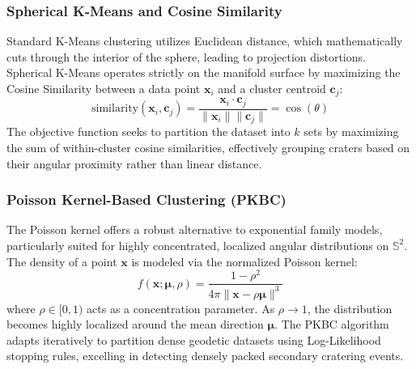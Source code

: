 \documentclass[12pt,a4paper]{report}
\begin{document}
\subsubsection{Spherical K-Means and Cosine Similarity}
Standard K-Means clustering utilizes Euclidean distance, which mathematically cuts through the interior of the sphere, leading to projection distortions. Spherical K-Means operates strictly on the manifold surface by maximizing the Cosine Similarity between a data point $\mathbf{x}_i$ and a cluster centroid $\mathbf{c}_j$:
\begin{equation}
    \text{similarity}(\mathbf{x}_i, \mathbf{c}_j) = \frac{\mathbf{x}_i \cdot \mathbf{c}_j}{\|\mathbf{x}_i\| \|\mathbf{c}_j\|} = \cos(\theta)
\end{equation}
The objective function seeks to partition the dataset into $k$ sets by maximizing the sum of within-cluster cosine similarities, effectively grouping craters based on their angular proximity rather than linear distance.

\subsubsection{Poisson Kernel-Based Clustering (PKBC)}
The Poisson kernel offers a robust alternative to exponential family models, particularly suited for highly concentrated, localized angular distributions on $\mathbb{S}^2$. The density of a point $\mathbf{x}$ is modeled via the normalized Poisson kernel:
\begin{equation}
    f(\mathbf{x}; \boldsymbol{\mu}, \rho) = \frac{1 - \rho^2}{4\pi \|\mathbf{x} - \rho\boldsymbol{\mu}\|^3}
\end{equation}
where $\rho \in [0,1)$ acts as a concentration parameter. As $\rho \to 1$, the distribution becomes highly localized around the mean direction $\boldsymbol{\mu}$. The PKBC algorithm adapts iteratively to partition dense geodetic datasets using Log-Likelihood stopping rules, excelling in detecting densely packed secondary cratering events.
\end{document}
